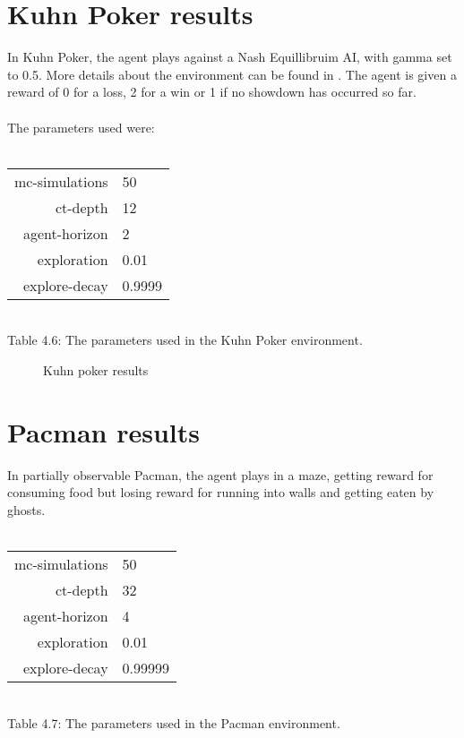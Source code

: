 \documentclass[pdftex,twoside,a4paper]{report}
\begin{document}
\section{Kuhn Poker results}
In Kuhn Poker, the agent plays against a Nash Equillibruim AI, with gamma set to 0.5. More details about the environment can be found in \cite{kuhn}. The agent is given a reward of 0 for a loss, 2 for a win or 1 if no showdown has occurred so far.\\\\
The parameters used were:\\\\
\begin{center}
\begin{tabular}{| r | l | }
\hline
mc-simulations & 50\\
ct-depth & 12\\
agent-horizon & 2\\
exploration & 0.01\\
explore-decay & 0.9999\\
\hline
\end{tabular}\\
\vspace{0.5mm}
Table 4.6: The parameters used in the Kuhn Poker environment.
\end{center}

\begin{figure}[h]
  \begin{center}
  \end{center}
  \caption{Kuhn poker results}
  \label{fig:kuhn_results}
\end{figure}

\section{Pacman results}
In partially observable Pacman, the agent plays in a maze, getting reward for consuming food but losing reward for running into walls and getting eaten by ghosts.\\\\
\begin{center}
\begin{tabular}{| r | l | }
\hline
mc-simulations & 50\\
ct-depth & 32\\
agent-horizon & 4\\
exploration & 0.01\\
explore-decay & 0.99999\\
\hline
\end{tabular}\\
\vspace{0.5mm}
Table 4.7: The parameters used in the Pacman environment.
\end{center}
\end{document}

